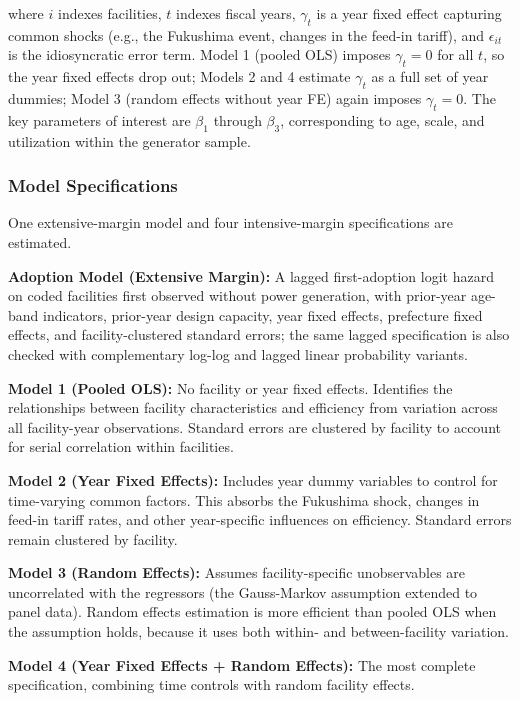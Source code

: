\documentclass[12pt,a4paper]{article}
\begin{document}
where $i$ indexes facilities, $t$ indexes fiscal years, $\gamma_t$ is a year fixed effect capturing common shocks (e.g., the Fukushima event, changes in the feed-in tariff), and $\epsilon_{it}$ is the idiosyncratic error term. Model 1 (pooled OLS) imposes $\gamma_t = 0$ for all $t$, so the year fixed effects drop out; Models 2 and 4 estimate $\gamma_t$ as a full set of year dummies; Model 3 (random effects without year FE) again imposes $\gamma_t = 0$. The key parameters of interest are $\beta_1$ through $\beta_3$, corresponding to age, scale, and utilization within the generator sample.

\subsubsection{Model Specifications}

One extensive-margin model and four intensive-margin specifications are estimated.

\textbf{Adoption Model (Extensive Margin):} A lagged first-adoption logit hazard on coded facilities first observed without power generation, with prior-year age-band indicators, prior-year design capacity, year fixed effects, prefecture fixed effects, and facility-clustered standard errors; the same lagged specification is also checked with complementary log-log and lagged linear probability variants.

\textbf{Model 1 (Pooled OLS):} No facility or year fixed effects. Identifies the relationships between facility characteristics and efficiency from variation across all facility-year observations. Standard errors are clustered by facility to account for serial correlation within facilities.

\textbf{Model 2 (Year Fixed Effects):} Includes year dummy variables to control for time-varying common factors. This absorbs the Fukushima shock, changes in feed-in tariff rates, and other year-specific influences on efficiency. Standard errors remain clustered by facility.

\textbf{Model 3 (Random Effects):} Assumes facility-specific unobservables are uncorrelated with the regressors (the Gauss-Markov assumption extended to panel data). Random effects estimation is more efficient than pooled OLS when the assumption holds, because it uses both within- and between-facility variation.

\textbf{Model 4 (Year Fixed Effects + Random Effects):} The most complete specification, combining time controls with random facility effects.
\end{document}
